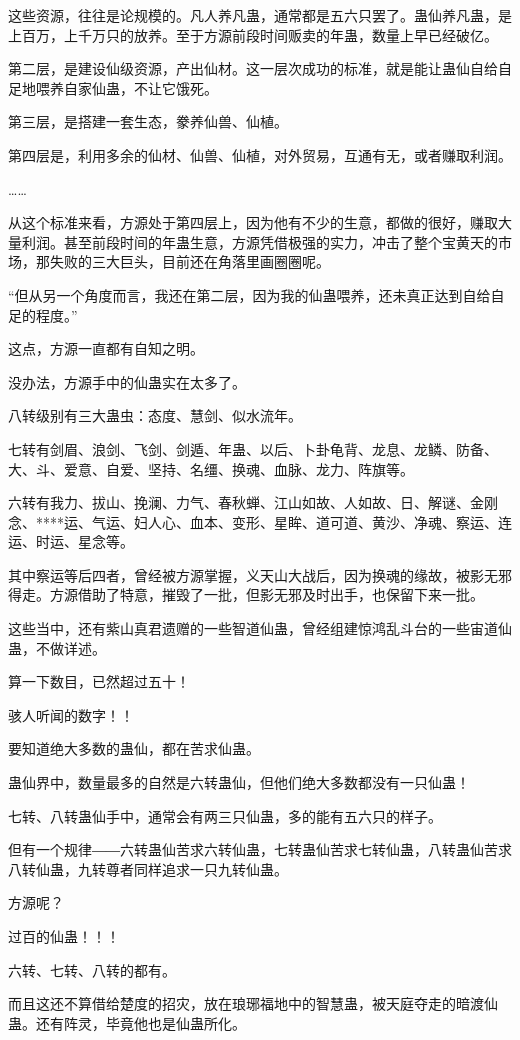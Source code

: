 \begin{this_body}
这些资源，往往是论规模的。凡人养凡蛊，通常都是五六只罢了。蛊仙养凡蛊，是上百万，上千万只的放养。至于方源前段时间贩卖的年蛊，数量上早已经破亿。

第二层，是建设仙级资源，产出仙材。这一层次成功的标准，就是能让蛊仙自给自足地喂养自家仙蛊，不让它饿死。

第三层，是搭建一套生态，豢养仙兽、仙植。

第四层是，利用多余的仙材、仙兽、仙植，对外贸易，互通有无，或者赚取利润。

……

从这个标准来看，方源处于第四层上，因为他有不少的生意，都做的很好，赚取大量利润。甚至前段时间的年蛊生意，方源凭借极强的实力，冲击了整个宝黄天的市场，那失败的三大巨头，目前还在角落里画圈圈呢。

“但从另一个角度而言，我还在第二层，因为我的仙蛊喂养，还未真正达到自给自足的程度。”

这点，方源一直都有自知之明。

没办法，方源手中的仙蛊实在太多了。

八转级别有三大蛊虫：态度、慧剑、似水流年。

七转有剑眉、浪剑、飞剑、剑遁、年蛊、以后、卜卦龟背、龙息、龙鳞、防备、大、斗、爱意、自爱、坚持、名缰、换魂、血脉、龙力、阵旗等。

六转有我力、拔山、挽澜、力气、春秋蝉、江山如故、人如故、日、解谜、金刚念、****运、气运、妇人心、血本、变形、星眸、道可道、黄沙、净魂、察运、连运、时运、星念等。

其中察运等后四者，曾经被方源掌握，义天山大战后，因为换魂的缘故，被影无邪得走。方源借助了特意，摧毁了一批，但影无邪及时出手，也保留下来一批。

这些当中，还有紫山真君遗赠的一些智道仙蛊，曾经组建惊鸿乱斗台的一些宙道仙蛊，不做详述。

算一下数目，已然超过五十！

骇人听闻的数字！！

要知道绝大多数的蛊仙，都在苦求仙蛊。

蛊仙界中，数量最多的自然是六转蛊仙，但他们绝大多数都没有一只仙蛊！

七转、八转蛊仙手中，通常会有两三只仙蛊，多的能有五六只的样子。

但有一个规律――六转蛊仙苦求六转仙蛊，七转蛊仙苦求七转仙蛊，八转蛊仙苦求八转仙蛊，九转尊者同样追求一只九转仙蛊。

方源呢？

过百的仙蛊！！！

六转、七转、八转的都有。

而且这还不算借给楚度的招灾，放在琅琊福地中的智慧蛊，被天庭夺走的暗渡仙蛊。还有阵灵，毕竟他也是仙蛊所化。


\end{this_body}
